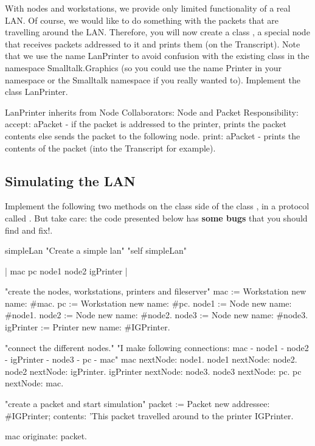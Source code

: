 \exercise With nodes and workstations, we provide only limited
functionality of a real LAN. Of course, we would like to do
something with the packets that are travelling around the LAN.
Therefore, you will now create a class , a special
node that receives packets addressed to it and prints them (on the
Transcript). Note that we use the name LanPrinter to avoid confusion with the existing class
 in the namespace Smalltalk.Graphics (so you could use the name Printer in your namespace or the Smalltalk namespace if you really wanted to). Implement the class LanPrinter.

\begin{code}
LanPrinter inherits from Node
Collaborators: Node and Packet
Responsibility:
accept: aPacket - if the packet is addressed to the
printer, prints the packet contents else sends the packet
to the following node.
print: aPacket - prints the contents of the packet
(into the Transcript for example).
\end{code}


\subsection*{Simulating the LAN}

Implement the following two methods on the class side of the class
, in a protocol called . But take
care: the code presented below has \textbf{some bugs} that you should
find and fix!.

\begin{code}
simpleLan
  "Create a simple lan"
  "self simpleLan"

 | mac pc node1 node2 igPrinter |

"create the nodes, workstations, printers and fileserver"
mac := Workstation new name: \#mac.
pc := Workstation new name: \#pc.
node1 := Node new name: \#node1.
node2 := Node new name: \#node2.
node3 := Node new name: \#node3.
igPrinter := Printer new name: \#IGPrinter.

"connect the different nodes."
"I make following connections:
\tab \tab mac -\ct{>} node1 -\ct{>} node2 -\ct{>}
\tab \tab igPrinter -\ct{>} node3 -\ct{>} pc -\ct{>} mac"
mac nextNode: node1.
node1 nextNode: node2.
node2 nextNode: igPrinter.
igPrinter nextNode: node3.
node3 nextNode: pc.
pc nextNode: mac.

"create a packet and start simulation"
packet := Packet new
            addressee: \#IGPrinter;
            contents: 'This packet travelled around
to the printer IGPrinter.

mac originate: packet.
\end{code}


